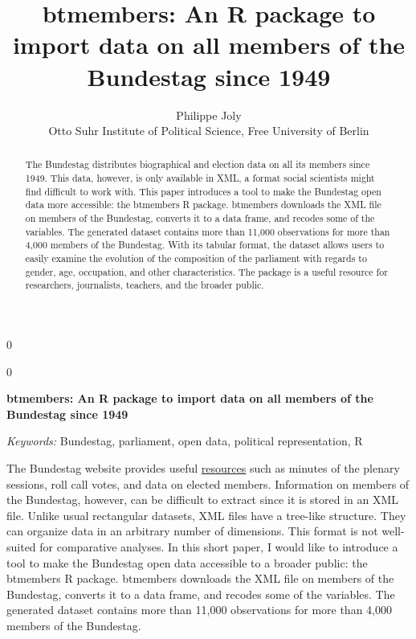 \documentclass[12pt]{article}
\newcommand{\blind}{0}
\begin{document}
\def\spacingset#1{\renewcommand{\baselinestretch}%
{#1}\small\normalsize} \spacingset{1}



\blind
{
  \title{\bf btmembers: An R package to import data on all members of
the Bundestag since 1949}

  \author{
        Philippe Joly \\
    Otto Suhr Institute of Political Science, Free University of
Berlin\\
      }
  \maketitle
} \fi

\blind
{
  \bigskip
  \bigskip
  \bigskip
  \begin{center}
    {\LARGE\bf btmembers: An R package to import data on all members of
the Bundestag since 1949}
  \end{center}
  \medskip
} \fi

\bigskip
\begin{abstract}
The Bundestag distributes biographical and election data on all its
members since 1949. This data, however, is only available in XML, a
format social scientists might find difficult to work with. This paper
introduces a tool to make the Bundestag open data more accessible: the
btmembers R package. btmembers downloads the XML file on members of the
Bundestag, converts it to a data frame, and recodes some of the
variables. The generated dataset contains more than 11,000 observations
for more than 4,000 members of the Bundestag. With its tabular format,
the dataset allows users to easily examine the evolution of the
composition of the parliament with regards to gender, age, occupation,
and other characteristics. The package is a useful resource for
researchers, journalists, teachers, and the broader public.
\end{abstract}

\noindent%
{\it Keywords:} Bundestag, parliament, open data, political
representation, R
\vfill

\newpage
\spacingset{1.45} %

The Bundestag website provides useful
\href{https://www.bundestag.de/services/opendata/}{resources} such as
minutes of the plenary sessions, roll call votes, and data on elected
members. Information on members of the Bundestag, however, can be
difficult to extract since it is stored in an XML file. Unlike usual
rectangular datasets, XML files have a tree-like structure. They can
organize data in an arbitrary number of dimensions. This format is not
well-suited for comparative analyses. In this short paper, I would like
to introduce a tool to make the Bundestag open data accessible to a
broader public: the btmembers R package. btmembers downloads the XML
file on members of the Bundestag, converts it to a data frame, and
recodes some of the variables. The generated dataset contains more than
11,000 observations for more than 4,000 members of the Bundestag.
\end{document}
